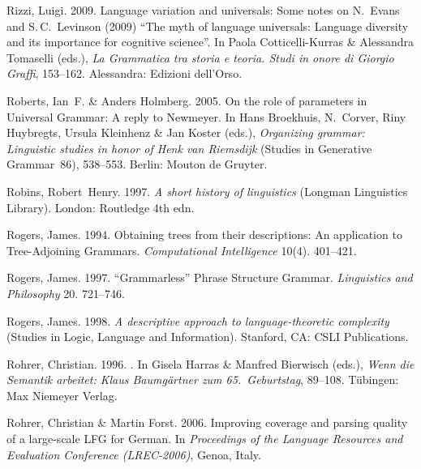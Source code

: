 \begin{thebibliography}{1420}
Rizzi, Luigi. 2009{}.
\newblock Language variation and universals: {Some} notes on {N.\ Evans and
  S.\,C.\ Levinson} (2009) ``{The} myth of language universals: {Language}
  diversity and its importance for cognitive science''.
\newblock In Paola Cotticelli-Kurras \& Alessandra Tomaselli (eds.), \emph{{La
  Grammatica tra storia e teoria. Studi in onore di Giorgio Graffi}}, 153--162.
  Alessandra: Edizioni dell'Orso.

Roberts, Ian~F. \& Anders Holmberg. 2005.
\newblock On the role of parameters in {Universal Grammar}: {A} reply to
  {Newmeyer}.
\newblock In Hans Broekhuis, N.~Corver, Riny Huybregts, Ursula Kleinhenz \& Jan
  Koster (eds.), \emph{Organizing grammar: {Linguistic} studies in honor of
  {Henk van Riemsdijk}} (Studies in {Generative Grammar}~86), 538--553. Berlin:
  Mouton de Gruyter.

Robins, Robert~Henry. 1997.
\newblock \emph{A short history of linguistics}  (Longman Linguistics Library).
\newblock London: Routledge 4th edn.

Rogers, James. 1994.
\newblock Obtaining trees from their descriptions: {An} application to
  {Tree-Adjoining Grammars}.
\newblock \emph{Computational Intelligence} 10(4). 401--421.

Rogers, James. 1997.
\newblock ``{Grammarless}'' {Phrase Structure Grammar}.
\newblock \emph{Linguistics and Philosophy} 20. 721--746.

Rogers, James. 1998.
\newblock \emph{A descriptive approach to language-theoretic complexity}
  (Studies in Logic, Language and Information).
\newblock Stanford, CA: CSLI Publications.

Rohrer, Christian. 1996.
.
\newblock In Gisela Harras \& Manfred Bierwisch (eds.), \emph{{Wenn die
  Semantik arbeitet: Klaus Baumg{\"a}rtner zum 65.\ Geburtstag}}, 89--108.
  T{\"u}bingen: Max Niemeyer Verlag.

Rohrer, Christian \& Martin Forst. 2006.
\newblock Improving coverage and parsing quality of a large-scale {LFG} for
  {German}.
\newblock In \emph{Proceedings of the {Language Resources and Evaluation
  Conference (LREC-2006)}}, Genoa, Italy.


\end{thebibliography}

